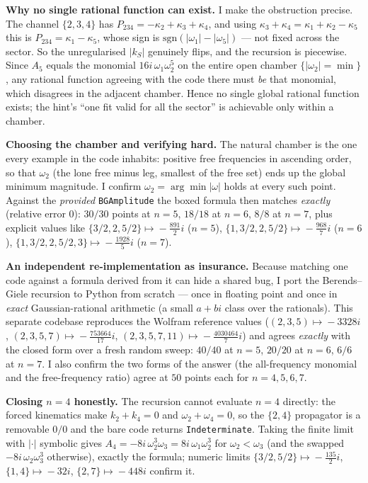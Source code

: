 \documentclass[11pt]{article}
\begin{document}
\medskip
\noindent\textbf{Why no single rational function can exist.}
I make the obstruction precise. The channel $\{2,3,4\}$ has
$P_{234}=-\kappa_2+\kappa_3+\kappa_4$, and using $\kappa_3+\kappa_4=\kappa_1+\kappa_2-\kappa_5$
this is $P_{234}=\kappa_1-\kappa_5$, whose sign is $\mathrm{sgn}(|\omega_1|-|\omega_5|)$ ---
not fixed across the sector. So the unregularised $|k_S|$ genuinely flips, and the recursion
is piecewise. Since $A_5$ equals the monomial $16i\,\omega_1\omega_2^5$ on the entire open
chamber $\{|\omega_2|=\min\}$, any rational function agreeing with the code there must
\emph{be} that monomial, which disagrees in the adjacent chamber. Hence no single global
rational function exists; the hint's ``one fit valid for all the sector'' is achievable only
within a chamber.

\medskip
\noindent\textbf{Choosing the chamber and verifying hard.}
The natural chamber is the one every example in the code inhabits: positive free frequencies
in ascending order, so that $\omega_2$ (the lone free minus leg, smallest of the free set)
ends up the global minimum magnitude. I confirm $\omega_2=\arg\min|\omega|$ holds at every
such point. Against the \emph{provided} \texttt{BGAmplitude} the boxed formula then matches
\emph{exactly} (relative error $0$): $30/30$ points at $n=5$, $18/18$ at $n=6$, $8/8$ at
$n=7$, plus explicit values like $\{3/2,2,5/2\}\!\mapsto\!-\tfrac{891}{2}i$ ($n=5$),
$\{1,3/2,2,5/2\}\!\mapsto\!-\tfrac{968}{7}i$ ($n=6$),
$\{1,3/2,2,5/2,3\}\!\mapsto\!-\tfrac{1928}{5}i$ ($n=7$).

\medskip
\noindent\textbf{An independent re-implementation as insurance.}
Because matching one code against a formula derived from it can hide a shared bug, I port the
Berends--Giele recursion to Python from scratch --- once in floating point and once in
\emph{exact} Gaussian-rational arithmetic (a small $a+bi$ class over the rationals). This
separate codebase reproduces the Wolfram reference values
($(2,3,5)\!\mapsto\!-3328i$, $(2,3,5,7)\!\mapsto\!-\tfrac{753664}{17}i$,
$(2,3,5,7,11)\!\mapsto\!-\tfrac{4030464}{7}i$) and agrees \emph{exactly} with the closed
form over a fresh random sweep: $40/40$ at $n=5$, $20/20$ at $n=6$, $6/6$ at $n=7$. I also
confirm the two forms of the answer (the all-frequency monomial and the free-frequency ratio)
agree at $50$ points each for $n=4,5,6,7$.

\medskip
\noindent\textbf{Closing $n=4$ honestly.}
The recursion cannot evaluate $n=4$ directly: the forced kinematics make $k_2+k_4=0$ and
$\omega_2+\omega_4=0$, so the $\{2,4\}$ propagator is a removable $0/0$ and the bare code
returns \texttt{Indeterminate}. Taking the finite limit with $|\cdot|$ symbolic gives
$A_4=-8i\,\omega_2^3\omega_3=8i\,\omega_1\omega_2^3$ for $\omega_2<\omega_3$ (and the swapped
$-8i\,\omega_2\omega_3^3$ otherwise), exactly the formula; numeric limits
$\{3/2,5/2\}\!\mapsto\!-\tfrac{135}{2}i$, $\{1,4\}\!\mapsto\!-32i$,
$\{2,7\}\!\mapsto\!-448i$ confirm it.
\end{document}
